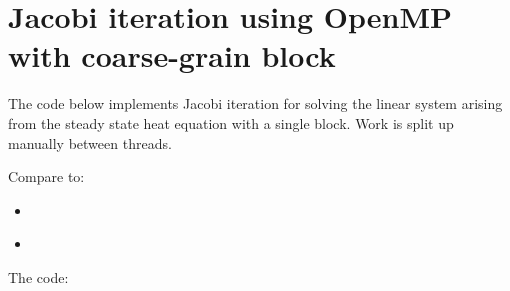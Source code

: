 \documentclass[letterpaper,10pt,english]{sphinxmanual}
\begin{document}
\section{Jacobi iteration using OpenMP with coarse-grain  block}
\label{jacobi1d_omp2:jacobi1d-omp2}\label{jacobi1d_omp2::doc}\label{jacobi1d_omp2:jacobi-iteration-using-openmp-with-coarse-grain-parallel-block}
The code below implements Jacobi iteration for solving the linear system
arising from the steady state heat equation
with a single  block.  Work is split up manually between threads.

Compare to:
\begin{itemize}
\item {} 
{\hyperref[jacobi1d_omp1:jacobi1d\string-omp1]{}}

\item {} 
{\hyperref[jacobi1d_mpi:jacobi1d\string-mpi]{}}

\end{itemize}

The code:
\end{document}
